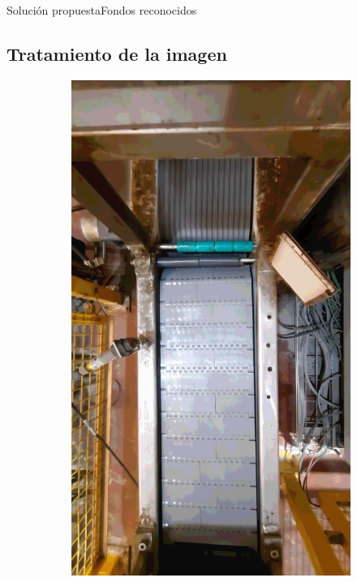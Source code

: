 \documentclass{beamer}
\begin{document}
\begin{frame}{Solución propuesta}{Fondos reconocidos}
\subsection{Tratamiento de la imagen}
\begin{figure}
\centering
    \begin{subfigure}[b]{0.3\textwidth}
        \includegraphics[width=\textwidth]{img/F1.png}
    \end{subfigure}

\end{figure}
\end{frame}
\end{document}
